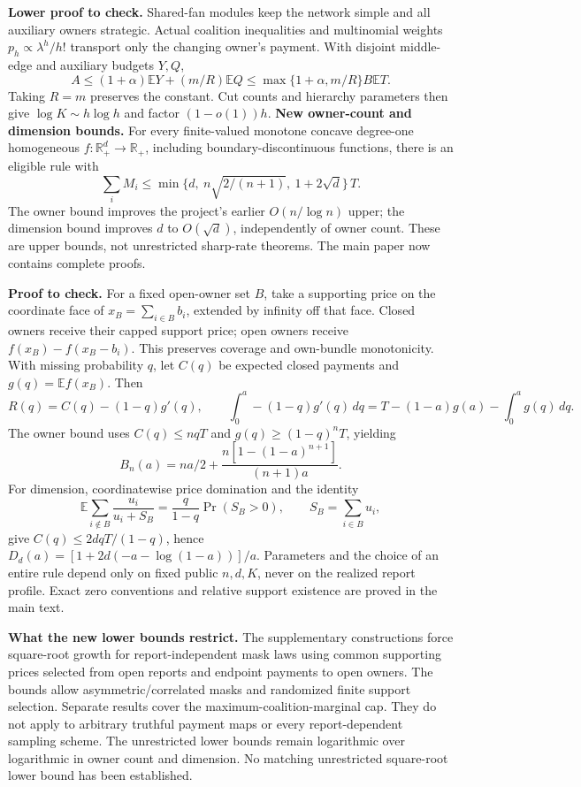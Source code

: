 \documentclass[11pt]{article}
\begin{document}
\textbf{Lower proof to check.} Shared-fan modules keep the network simple and
all auxiliary owners strategic. Actual coalition inequalities and multinomial
weights $p_h\propto\lambda^h/h!$ transport only the changing owner's payment.
With disjoint middle-edge and auxiliary budgets $Y,Q$,
\[
 A\le(1+\alpha)\mathbb EY+(m/R)\mathbb EQ
 \le\max\{1+\alpha,m/R\}B\mathbb ET.
\]
Taking $R=m$ preserves the constant. Cut counts and hierarchy parameters
then give $\log K\sim h\log h$ and factor $(1-o(1))h$.
\newpage
\textbf{New owner-count and dimension bounds.} For every finite-valued monotone
concave degree-one homogeneous $f:\mathbb R_+^d\to\mathbb R_+$, including
boundary-discontinuous functions, there is an eligible rule with
\[
 \sum_i M_i\le
 \min\{d,\ n\sqrt{2/(n+1)},\ 1+2\sqrt d\}\,T.
\]
The owner bound improves the project's earlier $O(n/\log n)$ upper; the
dimension bound improves $d$ to $O(\sqrt d)$, independently of owner count.
These are upper bounds, not unrestricted sharp-rate theorems. The main paper
now contains complete proofs.

\textbf{Proof to check.} For a fixed open-owner set $B$, take a supporting
price on the coordinate face of $x_B=\sum_{i\in B}b_i$, extended by infinity
off that face. Closed owners receive their capped support price; open owners
receive $f(x_B)-f(x_B-b_i)$. This preserves coverage and own-bundle monotonicity.
With missing probability $q$, let $C(q)$ be expected closed payments and
$g(q)=\mathbb E f(x_B)$. Then
\[
 R(q)=C(q)-(1-q)g'(q),\qquad
 \int_0^a-(1-q)g'(q)\,dq=T-(1-a)g(a)-\int_0^a g(q)\,dq.
\]
The owner bound uses $C(q)\le nqT$ and $g(q)\ge(1-q)^nT$, yielding
\[
 B_n(a)=na/2+\frac{n[1-(1-a)^{n+1}]}{(n+1)a}.
\]
For dimension, coordinatewise price domination and the identity
\[
 \mathbb E\sum_{i\notin B}\frac{u_i}{u_i+S_B}
 =\frac{q}{1-q}\Pr(S_B>0),\qquad S_B=\sum_{i\in B}u_i,
\]
give $C(q)\le2dqT/(1-q)$, hence
$D_d(a)=[1+2d(-a-\log(1-a))]/a$.
Parameters and the choice of an entire rule depend only on fixed public
$n,d,K$, never on the realized report profile. Exact zero conventions and
relative support existence are proved in the main text.

\textbf{What the new lower bounds restrict.} The supplementary constructions
force square-root growth for report-independent mask laws using common
supporting prices selected from open reports and endpoint payments to open
owners. The bounds allow asymmetric/correlated masks and randomized finite
support selection. Separate results cover the maximum-coalition-marginal cap.
They do not apply to arbitrary truthful payment maps or every report-dependent
sampling scheme. The unrestricted lower bounds remain logarithmic over
logarithmic in owner count and dimension. No matching unrestricted
square-root lower bound has been established.
\end{document}
